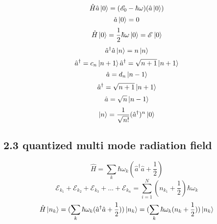 \documentclass[9pt]{article}
\begin{document}
\begin{equation}
    \hat{H}\hat{a}\ket{0}=(\mathscr{E}_0-\hbar\omega)(\hat{a}\ket{0})
\end{equation}
\begin{equation}
    \hat{a}\ket{0}=0
\end{equation}
\begin{equation}
    \hat{H}\ket{0}=\frac{1}{2}\hbar\omega\ket{0}=\mathscr{E}\ket{0}
\end{equation}
\begin{equation}
    \hat{a}^\dagger\hat{a}\ket{n}=n\ket{n}
\end{equation}
\begin{equation}
    \hat{a}^\dagger=c_n\ket{n+1} \hat{a}^\dagger=\sqrt{n+1}\ket{n+1}
\end{equation}
\begin{equation}
    \hat{a}=d_n\ket{n-1}
\end{equation}
\begin{equation}
    \hat{a}^\dagger=\sqrt{n+1}\ket{n+1}
\end{equation}
\begin{equation}
    \hat{a}=\sqrt{n}\ket{n-1}
\end{equation}
\begin{equation}
    \ket{n}=\frac{1}{\sqrt{n!}}(\hat{a}^\dagger)^n\ket{0}
\end{equation}
\subsection{2.3 quantized multi mode radiation field}
\begin{equation}
    \hat{H}=\sum_k\hbar\omega_k(\hat{a}^\dagger\hat{a}+\frac{1}{2})
\end{equation}
\begin{equation*}
    \mathscr{E}_{k_1}+\mathscr{E}_{k_2}+\mathscr{E}_{k_3}+...+\mathscr{E}_{k_n}=\sum^N_{i=1}(n_{k_1}+\frac{1}{2})\hbar\omega_k
\end{equation*}
\begin{equation}
    \hat{H}\ket{n_k}=(\sum_k\hbar\omega_k(\hat{a}^\dagger\hat{a}+\frac{1}{2}))\ket{n_k}=(\sum_k\hbar\omega_k(n_k+\frac{1}{2}))\ket{n_k}
\end{equation}
\end{document}
